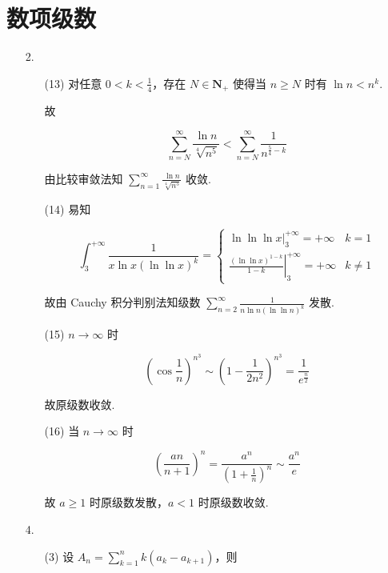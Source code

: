 \documentclass[oneside]{ctexbook} %
\begin{document}
\section{数项级数}

\begin{enumerate}
    \item[2.]
    \begin{enumerate}
        \item[(13)]
        对任意 $0 < k < \frac 1 4$，存在 $N \in \mathbf N_+$ 使得当 $n \geqslant N$ 时有 $\ln n < n^k$.
        
        故
        
        $$
        \sum_{n=N}^{\infty} \frac{\ln n}{\sqrt[4]{n^5}} < \sum_{n=N}^{\infty} \frac 1 {n^{\frac 5 4 - k}}
        $$
        
        由比较审敛法知 $\displaystyle \sum_{n=1}^{\infty} \frac{\ln n}{\sqrt[4]{n^5}}$ 收敛.
        \item[(14)]
        易知
        
        $$
        \int_3^{+\infty} \frac 1 {x \ln x (\ln \ln x)^k} = 
        \begin{cases}
            \ln \ln \ln x \bigg|_3^{+\infty} = +\infty & k = 1 \\
            \left. \frac{(\ln \ln x)^{1-k}}{1-k} \right|_3^{+\infty} = +\infty & k \neq 1
        \end{cases}
        $$
        
        故由 Cauchy 积分判别法知级数 $\displaystyle \sum_{n=2}^{\infty} \frac 1 {n \ln n (\ln \ln n)^k}$ 发散.
        \item[(15)]
        $n \to \infty$ 时
        
        $$
        \left( \cos \frac 1 n \right)^{n^3} \sim \left( 1 - \frac 1 {2n^2} \right)^{n^3} = \frac 1 {e^{\frac n 2}}
        $$
        
        故原级数收敛.
        \item[(16)]
        当 $n \to \infty$ 时
        
        $$
        \left( \frac{an}{n+1} \right)^n = \frac{a^n}{\left( 1 + \frac 1 n \right)^n} \sim \frac {a^n} e
        $$
        
        故 $a \geqslant 1$ 时原级数发散，$a < 1$ 时原级数收敛.
    \end{enumerate}
    \item[4.]
    \begin{enumerate}
        \item[(3)]
        设 $\displaystyle A_n = \sum_{k=1}^n k (a_k - a_{k+1})$，则
        

\end{enumerate}
\end{enumerate}
\end{document}
